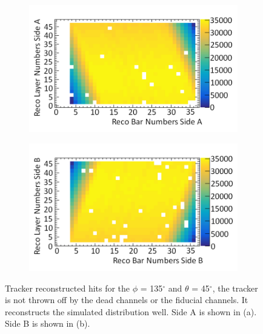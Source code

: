 \begin{figure}[!h]
\centering
\begin{subfigure}{.5\textwidth}
  \centering
  \includegraphics[width=\linewidth]{Chapter6/Figs/Raster/trackedAWithDeadMedText.png}
  \captionsetup{width=.9\linewidth}
  \caption{}
  \label{subFig:trackedAWithDead}
\end{subfigure}%
\begin{subfigure}{.5\textwidth}
  \centering
\includegraphics[width=\linewidth]{Chapter6/Figs/Raster/trackedBWithDeadMedText.png}
  \captionsetup{width=.9\linewidth}
  \caption{}
  \label{subFig:trackedBWithDead}
\end{subfigure}
\caption[Tracker reconstructed hits for the $\phi$ = 135$^\circ$ and $\theta$ = 45$^\circ$.]{Tracker reconstructed hits for the $\phi$ = 135$^\circ$ and $\theta$ = 45$^\circ$, the tracker is not thrown off by the dead channels or the fiducial channels. It reconstructs the simulated distribution well. Side A is shown in (a). Side B is shown in (b).}
\label{fig:trackedABWithDead}
\end{figure}

